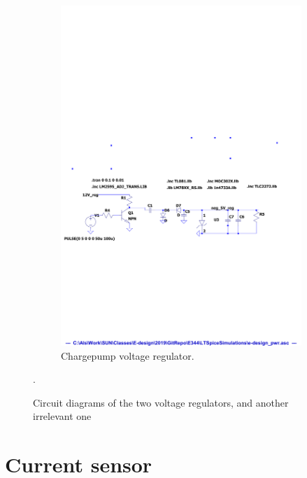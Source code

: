 \begin{figure}[H]
\begin{subfigure}[]{0.95\textwidth}
  	 \includegraphics[width=\linewidth]{./Figures/CctDia}
	  \caption{Chargepump voltage regulator.} \label{subfig:chargepump_circuit_diagram}	
   \end{subfigure}
   
   \caption {Circuit diagrams of the two voltage regulators, and another irrelevant one}.

      \label{fig:circuit_diagram}
 \end{figure}
\section{Current sensor}\label{sec:current_sensor_design}

\vfill


